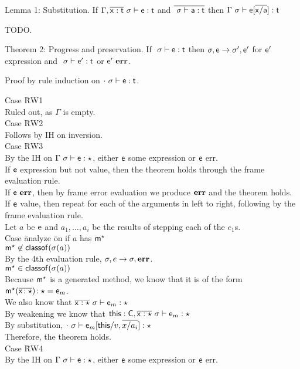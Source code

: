 \documentclass{report}
\newcommand{\m}{\M{\xt{m}}}
\newcommand{\e}{\M{\xt{e}}}
\newcommand{\x}{\M{\xt{x}}}
\renewcommand{\t}{\M{\xt{t}}}
\newcommand{\C}{\M{\xt{C}}}
\newcommand{\this}{\M{\xt{this}}}
\newcommand{\err}{\M{\bt{err}}}
\newcommand{\s}{\M{\sigma}}
\renewcommand{\a}{\M{\xt a}}
\newcommand{\any}{\M{\star}}
\newcommand{\HT}[2]{\M{{#1}\!:{#2}}}
\newcommand{\Mdef}[5]{\M{ \HT { #1( \b{\HT{#2}{#3}})}{#4}={#5}}}
\newcommand{\M}[1]{\ensuremath{#1}\xspace}
\newcommand{\xt}[1]{{\sf{#1}}\xspace}
\newcommand{\bt}[1]{\xt{\bf #1}}
\renewcommand{\b}[1]{\M{\overline{#1}}}
\newcommand{\classof}[1]{\M{\xt{classof}(#1)}}
\newcommand{\EnvType}[3]{ \M{#1 \vdash #2 : #3}}
\newcommand{\E}{\M{\Gamma}}
\newcommand{\Es}{\E ~\s}
\newcommand{\Dyn}[1]{\M{#1^{\any} }}
\begin{document}
Lemma 1: Substitution. If $\EnvType{\E,\b{\x:\t} ~ \s}{\e}{\t}$ and $\b{\EnvType{~\s}{\a}{\t}}$ then $\EnvType{\Es}{\e[\b{\x/\a}]}{\t}$

TODO.

Theorem 2: Progress and preservation. If $\EnvType{~\s}{\e}{\t}$ then $\s,\e \rightarrow \s',\e'$ for $\e'$ expression and $\EnvType{~\s}{\e'}{\t}$ or $\e' ~ \err$.

Proof by rule induction on $\EnvType{\cdot~\s}{\e}{\t}$.
\begin{tabbing}
Case \=RW1 \\
\> Ruled out, as $\E$ is empty.\\
Case \=RW2 \\
\> Follows by IH on inversion. \\
Case \=RW3 \\
\> By the IH on $\EnvType\Es\e\any$, either $\e$ some expression or $\e$ err. \\
\> If $\e$ expression but not value, then the theorem holds through the frame evaluation rule. \\
\> If $\e~\err$, then by frame error evaluation we produce $\err$ and the theorem holds. \\
\> If $\e$ value, then repeat for each of the arguments in left to right, following by the frame evaluation rule. \\
\> Let $a$ be $\e$ and $a_1,\ldots,a_i$ be the results of stepping each of the $e_1$s.\\
\> Case \=analyze \=on if $a$ has $\Dyn\m$\\
\> \> $\Dyn\m \not\in \classof{\s(a)}$\\
\> \> \> By the 4th evaluation rule, $\s,e \rightarrow \s,\err$.\\
\> \> $\Dyn\m \in \classof{\s(a)}$\\
\> \> \> Because $\Dyn\m$ is a generated method, we know that it is of the form $\Mdef{\Dyn\m}\x\any{\any}\e_m$.\\
\> \> \> We also know that $\EnvType{\b{\x:\any}~\s}{\e_m}\any$\\
\> \> \> By weakening we know that $\EnvType{\this:\C,\b{\x:\any}~\s}{\e_m}\any$\\
\> \> \> By substitution, $\EnvType{\cdot~\s}{\e_m[\this/v,\b{x/a_i}]}{\any}$\\
\> \> \> Therefore, the theorem holds. \\
Case \=RW4 \\
\> By the IH on $\EnvType\Es\e\any$, either $\e$ some expression or $\e$ err. \\

\end{tabbing}
\end{document}

